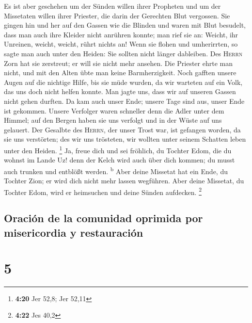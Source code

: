  Es ist aber geschehen um der Sünden willen ihrer
Propheten und um der Missetaten willen ihrer Priester, die darin der
Gerechten Blut vergossen.  Sie gingen hin und her auf den
Gassen wie die Blinden und waren mit Blut besudelt, dass man auch ihre
Kleider nicht anrühren konnte;  man rief sie an: Weicht,
ihr Unreinen, weicht, weicht, rührt nichts an! Wenn sie flohen und
umherirrten, so sagte man auch unter den Heiden: Sie sollten nicht
länger dableiben.  Des \textsc{Herrn} Zorn hat sie
zerstreut; er will sie nicht mehr ansehen. Die Priester ehrte man nicht,
und mit den Alten übte man keine Barmherzigkeit.  Noch
gafften unsere Augen auf die nichtige Hilfe, bis sie müde wurden, da wir
warteten auf ein Volk, das uns doch nicht helfen konnte. 
Man jagte uns, dass wir auf unseren Gassen nicht gehen durften. Da kam
auch unser Ende; unsere Tage sind aus, unser Ende ist gekommen.
 Unsere Verfolger waren schneller denn die Adler unter
dem Himmel; auf den Bergen haben sie uns verfolgt und in der Wüste auf
uns gelauert.  Der Gesalbte des \textsc{Herrn}, der unser
Trost war, ist gefangen worden, da sie uns verstörten; des wir uns
trösteten, wir wollten unter seinem Schatten leben unter den Heiden.
\footnote{\textbf{4:20} Jer 52,8; Jer 52,11}  Ja, freue
dich und sei fröhlich, du Tochter Edom, die du wohnst im Lande Uz! denn
der Kelch wird auch über dich kommen; du musst auch trunken und entblößt
werden. \textsuperscript{b}  Aber deine Missetat hat ein
Ende, du Tochter Zion; er wird dich nicht mehr lassen wegführen. Aber
deine Missetat, du Tochter Edom, wird er heimsuchen und deine Sünden
aufdecken. \footnote{\textbf{4:22} Jes 40,2}

\hypertarget{oraciuxf3n-de-la-comunidad-oprimida-por-misericordia-y-restauraciuxf3n}{%
\subsection{Oración de la comunidad oprimida por misericordia y
restauración}\label{oraciuxf3n-de-la-comunidad-oprimida-por-misericordia-y-restauraciuxf3n}}

\hypertarget{section-4}{%
\section{5}\label{section-4}}

